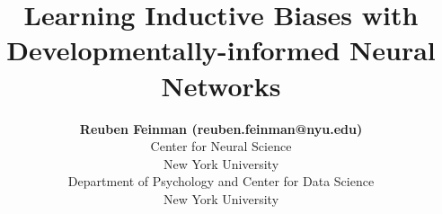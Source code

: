 \documentclass[10pt,letterpaper]{article}
\title{Learning Inductive Biases with Developmentally-informed Neural Networks}
\author{{\large \bf Reuben Feinman (reuben.feinman@nyu.edu)} \\
  Center for Neural Science \\
  New York University
  \AND {\large \bf Brenden M. Lake (brenden@nyu.edu)} \\
  Department of Psychology and Center for Data Science \\
  New York University}
\begin{document}
\maketitle


\begin{abstract}
    
\end{abstract}






\newpage


\newpage


\setlength{\bibleftmargin}{.125in}
\setlength{\bibindent}{-\bibleftmargin}


\end{document}
